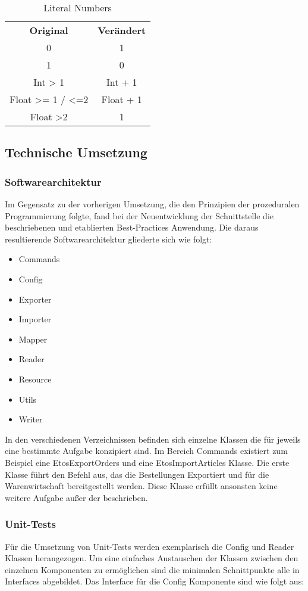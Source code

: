 \begin{table}[H]
	\caption{Literal Numbers}
	\begin{tabular}{cc}
		\textbf{Original} & \textbf{Verändert} \\
		0 & 1 \\
		1 & 0 \\
		Int > 1 & Int + 1 \\
		Float >= 1 / <=2 & Float + 1 \\
		Float >2 & 1 \\
	\end{tabular}
\end{table}

\subsection{Technische Umsetzung}
\subsubsection{Softwarearchitektur}
Im Gegensatz zu der vorherigen Umsetzung, die den Prinzipien der prozeduralen Programmierung folgte, fand bei der Neuentwicklung der Schnittstelle die beschriebenen und etablierten Best-Practices Anwendung. Die daraus resultierende Softwarearchitektur gliederte sich wie folgt:

\begin{itemize}
	\item Commands
	\item Config
	\item Exporter
	\item Importer
	\item Mapper
	\item Reader
	\item Resource
	\item Utils
	\item Writer
\end{itemize}

In den verschiedenen Verzeichnissen befinden sich einzelne Klassen die für jeweils eine bestimmte Aufgabe konzipiert sind. Im Bereich Commands existiert zum Beispiel eine EtosExportOrders und eine EtosImportArticles Klasse. Die erste Klasse führt den Befehl aus, das die Bestellungen Exportiert und für die Warenwirtschaft bereitgestellt werden. Diese Klasse erfüllt ansonsten keine weitere Aufgabe außer der beschrieben.

\subsubsection{Unit-Tests}
Für die Umsetzung von Unit-Tests werden exemplarisch die Config und Reader Klassen herangezogen. Um eine einfaches Austauschen der Klassen zwischen den einzelnen Komponenten zu ermöglichen sind die minimalen Schnittpunkte alle in Interfaces abgebildet. Das Interface für die Config Komponente sind wie folgt aus:

